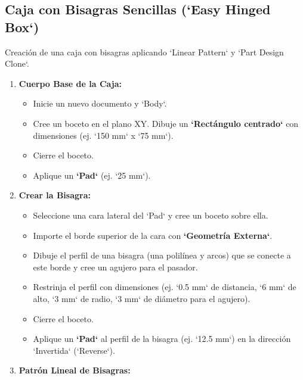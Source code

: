 \documentclass[12pt]{article}
\begin{document}

\subsection{Caja con Bisagras Sencillas (`Easy Hinged Box`)}
Creación de una caja con bisagras aplicando `Linear Pattern` y `Part Design Clone`.
\begin{enumerate}[label=\arabic*)]
    \item \textbf{Cuerpo Base de la Caja:}
    \begin{itemize}[label=\textendash]
        \item Inicie un nuevo documento y `Body`.
        \item Cree un boceto en el plano XY. Dibuje un \textbf{`Rectángulo centrado`} con dimensiones (ej. `150 mm` x `75 mm`).
        \item Cierre el boceto.
        \item Aplique un \textbf{`Pad`} (ej. `25 mm`).
    \end{itemize}
    \item \textbf{Crear la Bisagra:}
    \begin{itemize}[label=\textendash]
        \item Seleccione una cara lateral del `Pad` y cree un boceto sobre ella.
        \item Importe el borde superior de la cara con \textbf{`Geometría Externa`}.
        \item Dibuje el perfil de una bisagra (una polilínea y arcos) que se conecte a este borde y cree un agujero para el pasador.
        \item Restrinja el perfil con dimensiones (ej. `0.5 mm` de distancia, `6 mm` de alto, `3 mm` de radio, `3 mm` de diámetro para el agujero).
        \item Cierre el boceto.
        \item Aplique un \textbf{`Pad`} al perfil de la bisagra (ej. `12.5 mm`) en la dirección `Invertida` (`Reverse`).
    \end{itemize}
    \item \textbf{Patrón Lineal de Bisagras:}
    \begin{itemize}[label=\textendash]

\end{itemize}
\end{enumerate}
\end{document}
